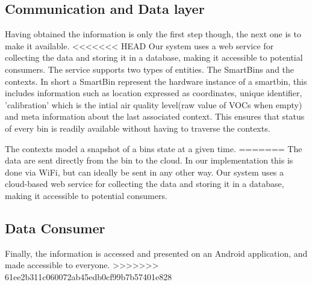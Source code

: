 \subsection{Communication and Data layer}
Having obtained the information is only the first step though, the next one is to make it available.
<<<<<<< HEAD
Our system uses a web service for collecting the data and storing it in a database, making it accessible to potential consumers.
The service supports two types of entities. The SmartBins and the contexts.
In short a SmartBin represent the hardware instance of a smartbin, this includes information such as location expressed as coordinates, unique identifier, 'calibration' which is the intial air quality level(raw value of VOCs when empty) and meta information about the last associated context.
This ensures that status of every bin is readily available without having to traverse the contexts.

The contexts model a snapshot of a bins state at a given time.
=======
The data are sent directly from the bin to the cloud. In our implementation this is done via WiFi, but can ideally be sent in any other way.
Our system uses a cloud-based web service for collecting the data and storing it in a database, making it accessible to potential consumers.

\subsection{Data Consumer}
Finally, the information is accessed and presented on an Android application, and made accessible to everyone. 
>>>>>>> 61ee2b311c060072ab45edb0cf99b7b57401e828
